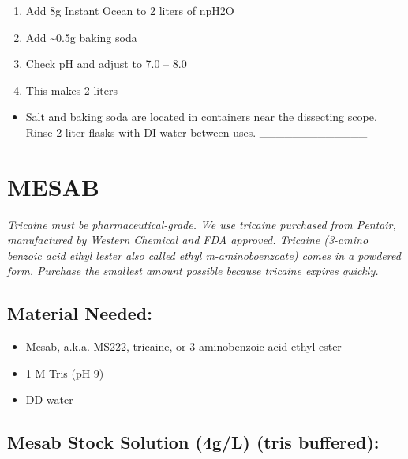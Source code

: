 \documentclass[
]{book}
\providecommand{\tightlist}{%
  \setlength{\itemsep}{0pt}\setlength{\parskip}{0pt}}
\begin{document}
\begin{enumerate}
\def\labelenumi{\arabic{enumi}.}
\tightlist
\item
  Add 8g Instant Ocean to 2 liters of npH2O
\item
  Add \textasciitilde0.5g baking soda
\item
  Check pH and adjust to 7.0 -- 8.0
\item
  This makes 2 liters
\end{enumerate}

\begin{itemize}
\tightlist
\item
  Salt and baking soda are located in containers near the dissecting scope. Rinse 2 liter flasks with DI water between uses.
  \_\_\_\_\_\_\_\_\_\_\_\_\_
\end{itemize}

\hypertarget{mesab}{%
\section{MESAB}\label{mesab}}

\emph{Tricaine must be pharmaceutical-grade. We use tricaine purchased from Pentair, manufactured by Western Chemical and FDA approved. Tricaine (3-amino benzoic acid ethyl lester also called ethyl m-aminoboenzoate) comes in a powdered form. Purchase the smallest amount possible because tricaine expires quickly.}

\hypertarget{material-needed-3}{%
\subsection{Material Needed:}\label{material-needed-3}}

\begin{itemize}
\tightlist
\item
  Mesab, a.k.a. MS222, tricaine, or 3-aminobenzoic acid ethyl ester
\item
  1 M Tris (pH 9)
\item
  DD water
\end{itemize}

\hypertarget{mesab-stock-solution-4gl-tris-buffered}{%
\subsection{Mesab Stock Solution (4g/L) (tris buffered):}\label{mesab-stock-solution-4gl-tris-buffered}}
\end{document}
